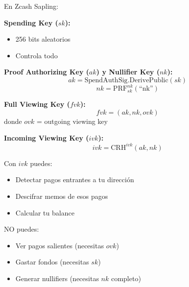 \documentclass[11pt,a4paper,twoside]{book}
\theoremstyle{definition}
\theoremstyle{remark}
\begin{document}
\begin{mathnote}
En Zcash Sapling:

\textbf{Spending Key ($sk$):}
\begin{itemize}
    \item 256 bits aleatorios
    \item Controla todo
\end{itemize}

\textbf{Proof Authorizing Key ($ak$) y Nullifier Key ($nk$):}
\[
ak = \text{SpendAuthSig.DerivePublic}(sk)
\]
\[
nk = \text{PRF}^{nk}_{sk}(\text{``nk''})
\]

\textbf{Full Viewing Key ($fvk$):}
\[
fvk = (ak, nk, ovk)
\]
donde $ovk$ = outgoing viewing key

\textbf{Incoming Viewing Key ($ivk$):}
\[
ivk = \text{CRH}^{ivk}(ak, nk)
\]

Con $ivk$ puedes:
\begin{itemize}
    \item Detectar pagos entrantes a tu dirección
    \item Descifrar memos de esos pagos
    \item Calcular tu balance
\end{itemize}

NO puedes:
\begin{itemize}
    \item Ver pagos salientes (necesitas $ovk$)
    \item Gastar fondos (necesitas $sk$)
    \item Generar nullifiers (necesitas $nk$ completo)
\end{itemize}
\end{mathnote}
\end{document}
